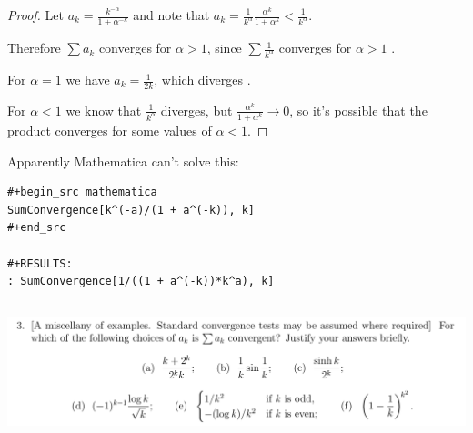 \documentclass[12pt]{article}
\begin{document}
\begin{proof}
  Let $a_k = \frac{k^{-\alpha}}{1 + \alpha^{-k}}$ and note that
  $a_k = \frac{1}{k^\alpha}\frac{\alpha^k}{1 + \alpha^k} < \frac{1}{k^\alpha}$.

  Therefore $\sum a_k$ converges for $\alpha > 1$, since $\sum \frac{1}{k^\alpha}$ converges for
  $\alpha > 1$ \red{[proof]}.

  For $\alpha=1$ we have $a_k = \frac{1}{2k}$, which diverges \red{[proof]}.

  For $\alpha < 1$ we know that $\frac{1}{k^\alpha}$ diverges, but
  $\frac{\alpha^k}{1 + \alpha^k} \to 0$, so it's possible that the product converges for some
  values of $\alpha < 1$.
\end{proof}

Apparently Mathematica can't solve this:

\begin{verbatim}
#+begin_src mathematica
SumConvergence[k^(-a)/(1 + a^(-k)), k]
#+end_src

#+RESULTS:
: SumConvergence[1/((1 + a^(-k))*k^a), k]
\end{verbatim}


\newpage
\subsection{}
\begin{mdframed}
  \includegraphics[width=400pt]{img/analysis--oxford-M2-I-6-3.png}
\end{mdframed}
\end{document}
